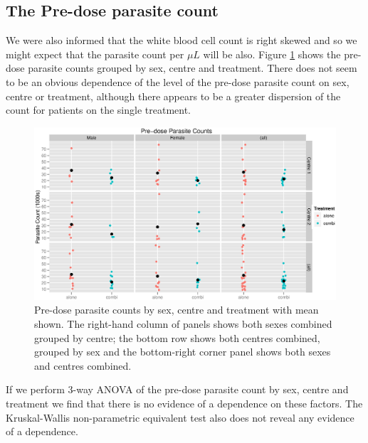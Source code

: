 \subsection{The Pre-dose parasite count}
We were also informed that the white blood cell count is right skewed and so we might expect that the parasite count per $\mu L$ will be also.
Figure \ref{preaov} shows the pre-dose parasite counts grouped by sex, centre and treatment. There does not seem to be an obvious dependence of the level of the pre-dose parasite count on sex, centre or treatment, although there appears to be a greater dispersion of the count for patients on the single treatment.
\begin{figure}[h]
\begin{center}
\includegraphics[width=6.1in]{preaov.eps}
\caption{Pre-dose parasite counts by sex, centre and treatment with mean shown. The right-hand column of panels shows both sexes combined grouped by centre; the bottom row shows both centres combined, grouped by sex and the bottom-right corner panel shows both sexes and centres combined.}
\label{preaov}
\end{center}
\end{figure}

If we perform 3-way ANOVA of the pre-dose parasite count by sex, centre and treatment we find that there is no evidence of a dependence on these factors. The Kruskal-Wallis non-parametric equivalent test also does not reveal any evidence of a dependence.

